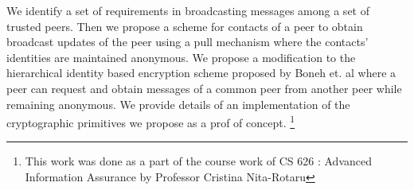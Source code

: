 We identify a set of requirements in broadcasting messages among a set of trusted peers. Then we propose a scheme for contacts of a peer to obtain broadcast updates of the peer using a pull mechanism where the contacts' identities are maintained anonymous. 
We propose a modification to the hierarchical identity based encryption scheme proposed by Boneh et. al \cite{BBG05} where a peer can request and obtain messages of a common peer from another peer while remaining anonymous. We provide details of an implementation of the cryptographic primitives we propose as a prof of concept. \footnote {This work was done as a part of the course work of CS 626 : Advanced Information Assurance by Professor Cristina Nita-Rotaru}
